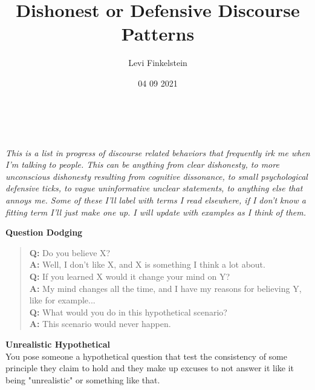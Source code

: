 \title{Dishonest or Defensive Discourse Patterns}
\author{Levi Finkelstein}
\date{04 09 2021}


\maketitle
\\\\
\it{This is a list in progress of discourse related behaviors that frequently irk me when I'm talking to people. This can be anything from clear dishonesty, to more unconscious dishonesty resulting from cognitive dissonance, to small  psychological defensive ticks, to vague uninformative unclear statements, to anything else that annoys me. Some of these I'll label with terms I read elsewhere, if I don't know a fitting term I'll just make one up. I will update with examples as I think of them.}
\par
\textbf{Question Dodging} 
\begin{quote}
\textbf{Q:} Do you believe X?\\ \textbf{A:} Well, I don't like X, and X is something I think a lot about. \\ \textbf{Q:} If you learned X would it change your mind on Y? \\ \textbf{A:} My mind changes all the time, and I have my reasons for believing Y, like for example...\\ \textbf{Q:} What would you do in this hypothetical scenario?\\ \textbf{A:} This scenario would never happen.\\ 
\end{quote}
\par
\textbf{Unrealistic Hypothetical}\\
You pose someone a hypothetical question that test the consistency of some principle they claim to hold and they make up excuses to not answer it like it being "unrealistic" or something like that.

